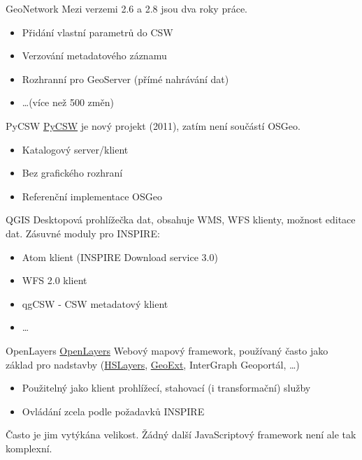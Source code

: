 \documentclass{beamer}
\begin{document}
\begin{frame}{GeoNetwork}
Mezi verzemi 2.6 a 2.8 jsou dva roky práce.
    \begin{itemize}
        \item Přidání vlastní parametrů do CSW
        \item Verzování metadatového záznamu
        \item Rozhranní pro GeoServer (přímé nahrávání dat)
        \item \dots (více než 500 změn)
    \end{itemize}
\end{frame}

\begin{frame}{PyCSW}
    \href{http://pycsw.org}{PyCSW} je nový projekt (2011), zatím není součástí OSGeo. 
    \begin{itemize}
        \item Katalogový server/klient
        \item Bez grafického rozhraní
        \item Referenční implementace OSGeo
    \end{itemize}
\end{frame}

\begin{frame}{QGIS}
    Desktopová prohlížečka dat, obsahuje WMS, WFS klienty, možnost editace dat.
    Zásuvné moduly pro INSPIRE:
    \begin{itemize}
        \item Atom klient (INSPIRE Download service 3.0)
        \item WFS 2.0 klient
        \item qgCSW - CSW metadatový klient
        \item \dots
    \end{itemize}
\end{frame}

\begin{frame}{OpenLayers}
    \href{http://openlayers.org}{OpenLayers} Webový mapový framework, používaný
    často jako základ pro nadstavby (\href{http://hslayers.org}{HSLayers},
    \href{http://geoext.org}{GeoExt}, InterGraph Geoportál, \dots)

    \begin{itemize}
        \item Použitelný jako klient prohlížecí, stahovací (i transformační) služby
        \item Ovládání zcela podle požadavků INSPIRE
    \end{itemize}

    Často je jim vytýkána velikost. Žádný další JavaScriptový framework není ale
    tak komplexní.
\end{frame}
\end{document}
